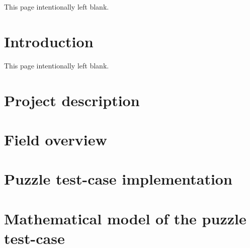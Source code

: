 \documentclass[letter,11pt,oneside]{report}
\begin{document}
\pagebreak
\thispagestyle{empty}
\begin{center}\tiny \sc This page intentionally left blank.\end{center}
\pagebreak

\setcounter{page}{1}
\setcounter{lofdepth}{2}
\listoffigures
\listoftables


\cleardoublepage
\tableofcontents   %




\chapter{Introduction} %
\label{cha:introduction}
	

\pagebreak
\thispagestyle{empty}
\begin{center}\tiny \sc This page intentionally left blank.\end{center}
\pagebreak


\chapter{Project description} %
\label{cha:project_description}
	


\chapter{Field overview} %
\label{cha:field_overview}
	

\chapter{Puzzle test-case implementation} %
\label{cha:puzzle_test_case_implementation}
	

\chapter{Mathematical model of the puzzle test-case} %
\label{cha:mathematical_model_of_the_puzzle_test_case}
	
\end{document}
